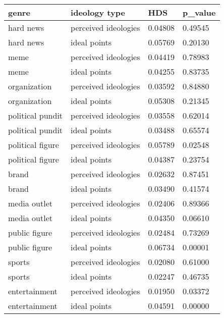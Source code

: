 \begin{table}
\centering
\begin{tabular}[t]{llll}
\toprule
genre & ideology type & HDS & p\_value\\
\midrule
hard news & perceived ideologies & 0.04808 & 0.49545\\
hard news & ideal points & 0.05769 & 0.20130\\
meme & perceived ideologies & 0.04419 & 0.78983\\
meme & ideal points & 0.04255 & 0.83735\\
organization & perceived ideologies & 0.03592 & 0.84880\\
organization & ideal points & 0.05308 & 0.21345\\
political pundit & perceived ideologies & 0.03558 & 0.62014\\
political pundit & ideal points & 0.03488 & 0.65574\\
political figure & perceived ideologies & 0.05789 & 0.02548\\
political figure & ideal points & 0.04387 & 0.23754\\
brand & perceived ideologies & 0.02632 & 0.87451\\
brand & ideal points & 0.03490 & 0.41574\\
media outlet & perceived ideologies & 0.02406 & 0.89366\\
media outlet & ideal points & 0.04350 & 0.06610\\
public figure & perceived ideologies & 0.02484 & 0.73269\\
public figure & ideal points & 0.06734 & 0.00001\\
sports & perceived ideologies & 0.02080 & 0.61000\\
sports & ideal points & 0.02247 & 0.46735\\
entertainment & perceived ideologies & 0.01950 & 0.03372\\
entertainment & ideal points & 0.04591 & 0.00000\\
\bottomrule
\end{tabular}
\end{table}
